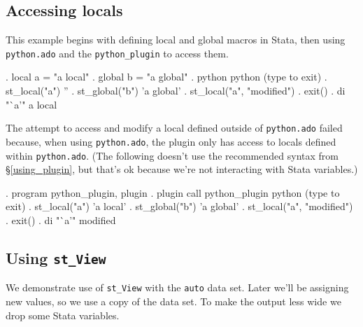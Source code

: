 \documentclass{article}
\begin{document}
\subsection{Accessing locals} \label{local_example}

This example begins with defining local and global macros in Stata, then using \lstinline$python.ado$ and the \lstinline$python_plugin$ to access them. 

\begin{stlog}
{\smallskip}
. local a = "a local"
{\smallskip}
. global b = "a global"
{\smallskip}
. python
 python (type {} to exit) 
. st_local("a")
''
{\smallskip}
. st_global("b")
'a global'
{\smallskip}
. st_local("a", "modified")
{\smallskip}
. exit()
{\smallskip}
. di "`a'"
a local
\end{stlog}

\vspace{2mm}
The attempt to access and modify a local defined outside of \lstinline$python.ado$ failed because, when using \lstinline$python.ado$, the plugin only has access to locals defined within \lstinline$python.ado$. (The following doesn't use the recommended syntax from \S\ref{using_plugin}, but that's ok because we're not interacting with Stata variables.)

\begin{stlog}
{\smallskip}
. program python_plugin, plugin
{\smallskip}
. plugin call python_plugin
 python (type {} to exit) 
. st_local("a")
'a local'
{\smallskip}
. st_global("b")
'a global'
{\smallskip}
. st_local("a", "modified")
{\smallskip}
. exit()
{\smallskip}
. di "`a'"
modified
\end{stlog}


\subsection{Using \lstinline{st_View}} \label{st_View_example}

We demonstrate use of \lstinline{st_View} with the \lstinline{auto} data set. Later we'll be assigning new values, so we use a copy of the data set. To make the output less wide we drop some Stata variables.
\end{document}
